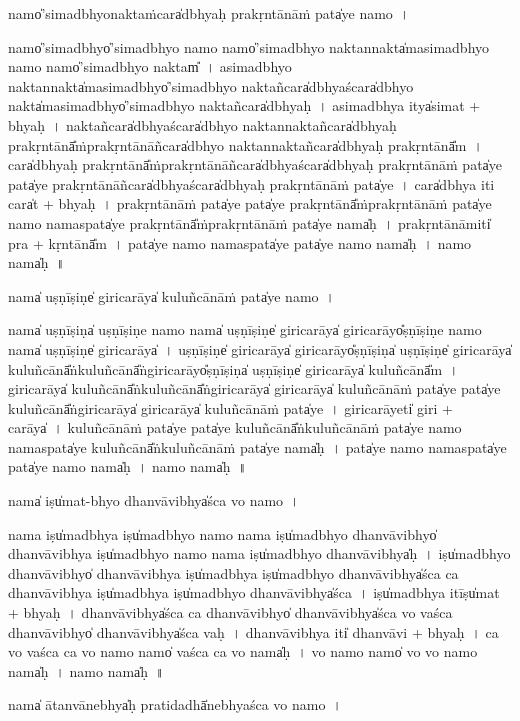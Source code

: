 \documentclass[parskip, DIV=14]{scrartcl}
\begin{document}
{namo̍'si॒madbhyo॒nakta॒ṁcara̍dbhyaḥ prakṛ॒ntānā॒ṁ pata̍ye॒ namo॒~।

namo̍'si॒madbhyo̍'si॒madbhyo॒ namo॒ namo̍'si॒madbhyo॒ nakta॒nnakta̍masi॒madbhyo॒ namo॒ namo̍'si॒madbhyo॒ naktam̎~।
 a॒si॒madbhyo॒ nakta॒nnakta̍masi॒madbhyo̍'si॒madbhyo॒ nakta॒ñcara̍dbhya॒ścara̍dbhyo॒ nakta̍masi॒madbhyo̍'si॒madbhyo॒ nakta॒ñcara̍dbhyaḥ~।
 a॒si॒madbhya॒ itya̍si॒mat + bhya॒ḥ~।
 nakta॒ñcara̍dbhya॒ścara̍dbhyo॒ nakta॒nnakta॒ñcara̍dbhyaḥ prakṛ॒ntānā̎ṁprakṛ॒ntānā॒ñcara̍dbhyo॒ nakta॒nnakta॒ñcara̍dbhyaḥ prakṛ॒ntānā̎m~।
 cara̍dbhyaḥ prakṛ॒ntānā̎ṁprakṛ॒ntānā॒ñcara̍dbhya॒ścara̍dbhyaḥ prakṛ॒ntānā॒ṁ pata̍ye॒ pata̍ye prakṛ॒ntānā॒ñcara̍dbhya॒ścara̍dbhyaḥ prakṛ॒ntānā॒ṁ pata̍ye~।
 cara̍dbhya॒ iti॒ cara̍t + bhya॒ḥ~।
 pra॒kṛ॒ntānā॒ṁ pata̍ye॒ pata̍ye prakṛ॒ntānā̎ṁprakṛ॒ntānā॒ṁ pata̍ye॒ namo॒ nama॒spata̍ye prakṛ॒ntānā̎ṁprakṛ॒ntānā॒ṁ pata̍ye॒ nama̍ḥ~।
 pra॒kṛ॒ntānā॒miti̍ pra + kṛ॒ntānā̎m~।
pata̍ye॒ namo॒ nama॒spata̍ye॒ pata̍ye॒ namo॒ nama̍ḥ~।
namo॒ nama̍ḥ~॥ 

nama̍ uṣṇī॒ṣiṇe̍ girica॒rāya̍ kulu॒ñcānā॒ṁ pata̍ye॒ namo॒~। 

nama̍ uṣṇī॒ṣiṇa̍ uṣṇī॒ṣiṇe॒ namo॒ nama̍ uṣṇī॒ṣiṇe̍ girica॒rāya̍ girica॒rāyo̎ṣṇī॒ṣiṇe॒ namo॒ nama̍ uṣṇī॒ṣiṇe̍ girica॒rāya̍~। 
u॒ṣṇī॒ṣiṇe̍ girica॒rāya̍ girica॒rāyo̎ṣṇī॒ṣiṇa̍ uṣṇī॒ṣiṇe̍ girica॒rāya̍ kulu॒ñcānā̎ṅkulu॒ñcānā̎ṅgirica॒rāyo̎ṣṇī॒ṣiṇa̍ uṣṇī॒ṣiṇe̍ girica॒rāya̍ kulu॒ñcānā̎m~। 
gi॒ri॒ca॒rāya̍ kulu॒ñcānā̎ṅkulu॒ñcānā̎ṅgirica॒rāya̍ girica॒rāya̍ kulu॒ñcānā॒ṁ pata̍ye॒ pata̍ye kulu॒ñcānā̎ṅgirica॒rāya̍ girica॒rāya̍ kulu॒ñcānā॒ṁ pata̍ye~। 
gi॒ri॒ca॒rāyeti̍ giri + ca॒rāya̍~। 
ku॒lu॒ñcānā॒ṁ pata̍ye॒ pata̍ye kulu॒ñcānā̎ṅkulu॒ñcānā॒ṁ pata̍ye॒ namo॒ nama॒spata̍ye kulu॒ñcānā̎ṅkulu॒ñcānā॒ṁ pata̍ye॒ nama̍ḥ~। 
pata̍ye॒ namo॒ nama॒spata̍ye॒ pata̍ye॒ namo॒ nama̍ḥ~।
namo॒ nama̍ḥ~॥ 

nama̍ iṣu̍mat-bhyo dhanvā॒vibhya̍śca vo॒ namo~।

nama॒ iṣu̍madbhya॒ iṣu̍madbhyo॒ namo॒ nama॒ iṣu̍madbhyo dhanvā॒vibhyo̍ dhanvā॒vibhya॒ iṣu̍madbhyo॒ namo॒ nama॒ iṣu̍madbhyo dhanvā॒vibhya̍ḥ~।
iṣu̍madbhyo dhanvā॒vibhyo̍ dhanvā॒vibhya॒ iṣu̍madbhya॒ iṣu̍madbhyo dhanvā॒vibhya̍śca ca dhanvā॒vibhya॒ iṣu̍madbhya॒ iṣu̍madbhyo dhanvā॒vibhya̍śca~।
iṣu̍madbhya॒ itīṣu̍mat + bhya॒ḥ~।
dha॒nvā॒vibhya̍śca ca dhanvā॒vibhyo̍ dhanvā॒vibhya̍śca vo vaśca dhanvā॒vibhyo̍ dhanvā॒vibhya̍śca vaḥ~।
dha॒nvā॒vibhya॒ iti̍ dhanvā॒vi + bhya॒ḥ~।
ca॒ vo॒ va॒śca॒ ca॒ vo॒ namo॒ namo̍ vaśca ca vo॒ nama̍ḥ~।
vo॒ namo॒ namo̍ vo vo॒ namo॒ nama̍ḥ~।
namo॒ nama̍ḥ~॥ 


nama̍ ātanvā॒nebhya̍ḥ prati॒dadhā̍nebhyaśca vo॒ namo~।

}
\end{document}
